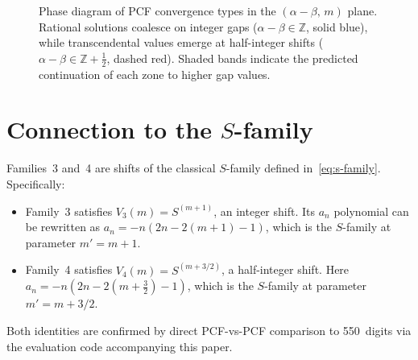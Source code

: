 \documentclass[11pt,a4paper]{article}
\theoremstyle{definition}
\theoremstyle{remark}
\begin{document}
\begin{figure}[htbp]
\caption{Phase diagram of PCF convergence types in the
$(\alpha{-}\beta,\, m)$ plane.
Rational solutions coalesce on integer gaps
($\alpha - \beta \in \mathbb{Z}$, solid blue),
while transcendental values emerge at half-integer shifts
($\alpha - \beta \in \mathbb{Z} + \tfrac{1}{2}$, dashed red).
Shaded bands indicate the predicted continuation of each zone
to higher gap values.}
\label{fig:dichotomy}
\end{figure}

\section{Connection to the $S$-family}\label{sec:s-family}

Families~3 and~4 are shifts of the classical $S$-family defined
in~\eqref{eq:s-family}.  Specifically:
\begin{itemize}
\item Family~3 satisfies $V_3(m) = S^{(m+1)}$, an integer shift.
  Its $a_n$ polynomial can be rewritten as
  $a_n = -n(2n - 2(m{+}1) - 1)$, which is the $S$-family
  at parameter $m' = m+1$.
\item Family~4 satisfies $V_4(m) = S^{(m+3/2)}$, a half-integer shift.
  Here $a_n = -n(2n - 2(m{+}\tfrac{3}{2}) - 1)$, which is the $S$-family
  at parameter $m' = m + 3/2$.
\end{itemize}
Both identities are confirmed by direct PCF-vs-PCF comparison
to 550~digits via the evaluation code accompanying this paper.
\end{document}
